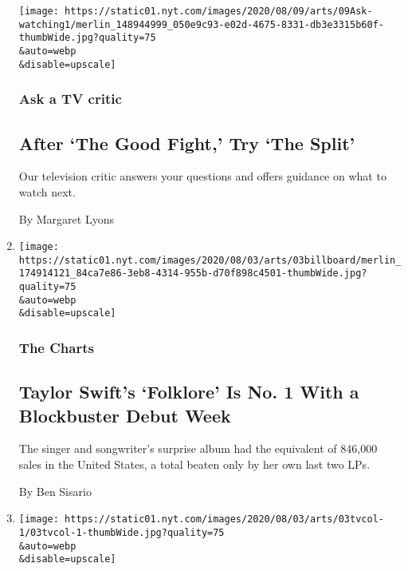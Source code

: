\begin{enumerate}
  \texttt{[image: https://static01.nyt.com/images/2020/08/09/arts/09Ask-watching1/merlin\_148944999\_050e9c93-e02d-4675-8331-db3e3315b60f-thumbWide.jpg?quality=75\\\&auto=webp\\\&disable=upscale]}

  \hypertarget{ask-a-tv-critic}{%
  \subsubsection{Ask a TV critic}\label{ask-a-tv-critic}}

  \hypertarget{after-the-good-fight-try-the-split}{%
  \subsection{After `The Good Fight,' Try `The
  Split'}\label{after-the-good-fight-try-the-split}}

  Our television critic answers your questions and offers guidance on
  what to watch next.

  By Margaret Lyons
\item
  \href{/2020/08/03/arts/music/taylor-swift-folklore-billboard-chart.html}{}

  \texttt{[image: https://static01.nyt.com/images/2020/08/03/arts/03billboard/merlin\_174914121\_84ca7e86-3eb8-4314-955b-d70f898c4501-thumbWide.jpg?quality=75\\\&auto=webp\\\&disable=upscale]}

  \hypertarget{the-charts}{%
  \subsubsection{The Charts}\label{the-charts}}

  \hypertarget{taylor-swifts-folklore-is-no-1-with-a-blockbuster-debut-week}{%
  \subsection{Taylor Swift's `Folklore' Is No. 1 With a Blockbuster
  Debut
  Week}\label{taylor-swifts-folklore-is-no-1-with-a-blockbuster-debut-week}}

  The singer and songwriter's surprise album had the equivalent of
  846,000 sales in the United States, a total beaten only by her own
  last two LPs.

  By Ben Sisario
\item
  \href{/2020/08/03/arts/television/whats-on-tv-monday-immigration-nation-and-dora-and-the-lost-city-of-gold.html}{}

  \texttt{[image: https://static01.nyt.com/images/2020/08/03/arts/03tvcol-1/03tvcol-1-thumbWide.jpg?quality=75\\\&auto=webp\\\&disable=upscale]}


\end{enumerate}
